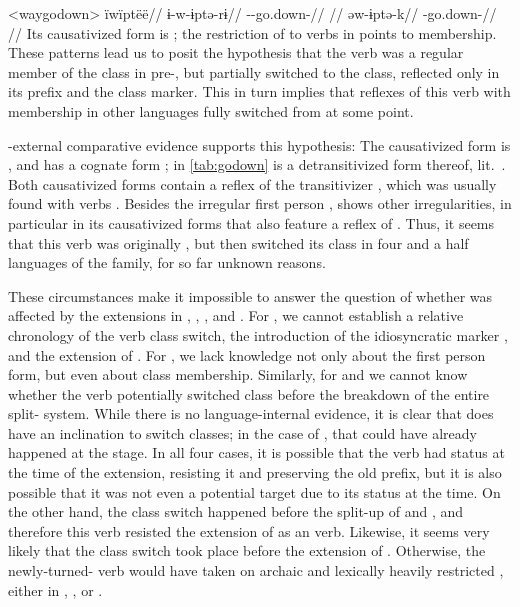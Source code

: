 \pex<waygodown>\wayana \parencite[][200]{wayanatavares2005}
\begingl
\glpreamble ïwïptëë//
\gla ɨ-w-ɨptə-rɨ//
\glb {}--go.down-//
\glft {}//
\endgl
{}
\begingl
\gla əw-ɨptə-k//
\glb {}-go.down-//
\glft {}//
\endgl
\xe
%
Its causativized form is  \parencite[255]{wayanatavares2005}; the restriction of  to  verbs in \PC \parencite{gildea2019overview} points to  membership.
These patterns lead us to posit the hypothesis that the verb was a regular member of the  class in pre-\wayana, but partially switched to the  class, reflected only in its  prefix and the  class marker.
This in turn implies that reflexes of this verb with  membership in other languages fully switched from  at some point.

\wayana-external comparative evidence supports this hypothesis:
The \arara causativized form is  \parencite[66]{alves2017arara}, and \kalina has a cognate form  \parencite[263]{courtz2008carib};   in \cref{tab:godown} is a detransitivized form thereof, lit.\ .
Both causativized forms contain a reflex of the transitivizer , which was usually found with  verbs \parencite{gildea2019overview}.
Besides the irregular first person , \trio {} shows other irregularities, in particular in its causativized forms that also feature a reflex of  \parencite[263]{triomeira1999}.
Thus, it seems that this verb was originally , but then switched its class in four and a half languages of the family, for so far unknown reasons.

These circumstances make it impossible to answer the question of whether  was affected by the extensions in \PWai, \PTir, \carijo, and \yukpa.
For \PTir, we cannot establish a relative chronology of the verb class switch, the introduction of the idiosyncratic marker , and the extension of .
For \PWai, we lack knowledge not only about the first person form, but even about class membership.
Similarly, for \carijo and \yukpa we cannot know whether the verb potentially switched class before the breakdown of the entire split- system.
While there is no language-internal evidence, it is clear that  does have an inclination to switch classes; in the case of \carijo, that could have already happened at the \PTar stage.
In all four cases, it is possible that the verb had  status at the time of the extension, resisting it and preserving the old prefix, but it is also possible that it was not even a potential target due to its  status at the time.
On the other hand, the class switch happened before the split-up of \trio and \akuriyo, and therefore this verb resisted the extension of \akuriyo {} as an  verb.
Likewise, it seems very likely that the class switch took place before the extension of \PPek {}.
Otherwise, the newly-turned- verb would have taken on archaic and lexically heavily restricted , either in \PTar, \PXin, or \arara. 

